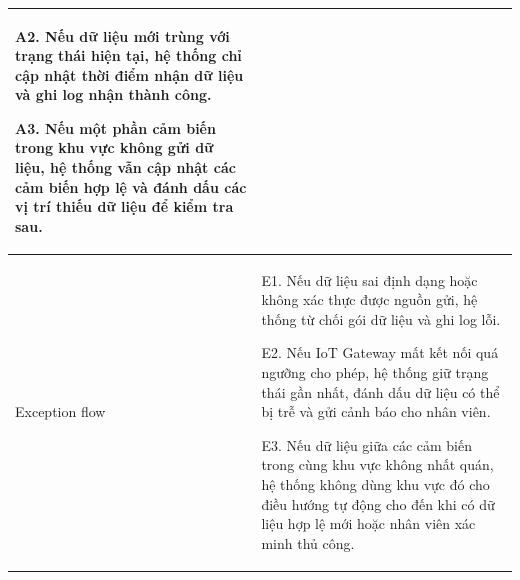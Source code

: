 \begin{center}
\begin{longtable}{|m{2.7cm}|m{12.8cm}|}
A2. Nếu dữ liệu mới trùng với trạng thái hiện tại, hệ thống chỉ cập nhật thời điểm nhận dữ liệu và ghi log nhận thành công.

A3. Nếu một phần cảm biến trong khu vực không gửi dữ liệu, hệ thống vẫn cập nhật các cảm biến hợp lệ và đánh dấu các vị trí thiếu dữ liệu để kiểm tra sau.\\
\hline
Exception flow & 
E1. Nếu dữ liệu sai định dạng hoặc không xác thực được nguồn gửi, hệ thống từ chối gói dữ liệu và ghi log lỗi.

E2. Nếu IoT Gateway mất kết nối quá ngưỡng cho phép, hệ thống giữ trạng thái gần nhất, đánh dấu dữ liệu có thể bị trễ và gửi cảnh báo cho nhân viên.

E3. Nếu dữ liệu giữa các cảm biến trong cùng khu vực không nhất quán, hệ thống không dùng khu vực đó cho điều hướng tự động cho đến khi có dữ liệu hợp lệ mới hoặc nhân viên xác minh thủ công.\\
\hline
\end{longtable}
\end{center}
